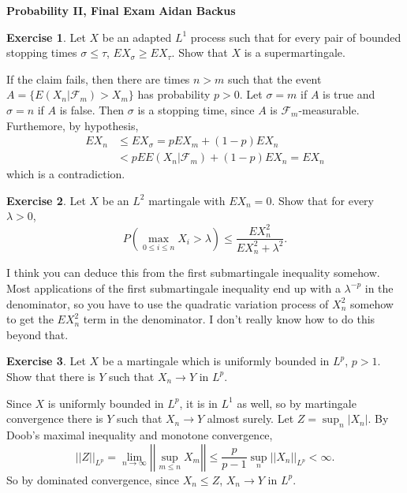 \documentclass[10pt]{article}
\theoremstyle{definition}
\newtheorem{exer}{Exercise}
\begin{document}
\noindent
\large\textbf{Probability II, Final Exam} \hfill \textbf{Aidan Backus} \\

\begin{exer}
Let $X$ be an adapted $L^1$ process such that for every pair of bounded stopping times $\sigma \leq \tau$, $EX_\sigma \geq EX_\tau$.
Show that $X$ is a supermartingale.
\end{exer}

If the claim fails, then there are times $n > m$ such that the event $A = \{E(X_n|\mathcal F_m) > X_m\}$ has probability $p > 0$.
Let $\sigma = m$ if $A$ is true and $\sigma = n$ if $A$ is false.
Then $\sigma$ is a stopping time, since $A$ is $\mathcal F_m$-measurable.
Furthemore, by hypothesis,
\begin{align*}
EX_n &\leq EX_\sigma = pEX_m + (1 - p)EX_n \\
&< pEE(X_n|\mathcal F_m) + (1 - p)EX_n = EX_n
\end{align*}
which is a contradiction.

\begin{exer}
Let $X$ be an $L^2$ martingale with $EX_n = 0$. Show that for every $\lambda > 0$,
$$P\left(\max_{0 \leq i \leq n} X_i > \lambda\right) \leq \frac{EX_n^2}{EX_n^2 + \lambda^2}.$$
\end{exer}

I think you can deduce this from the first submartingale inequality somehow.
Most applications of the first submartingale inequality end up with a $\lambda^{-p}$ in the denominator, so you have to use the quadratic variation process of $X_n^2$ somehow to get the $EX_n^2$ term in the denominator.
I don't really know how to do this beyond that.

\begin{exer}
Let $X$ be a martingale which is uniformly bounded in $L^p$, $p > 1$.
Show that there is $Y$ such that $X_n \to Y$ in $L^p$.
\end{exer}

Since $X$ is uniformly bounded in $L^p$, it is in $L^1$ as well, so by martingale convergence there is $Y$ such that $X_n \to Y$ almost surely.
Let $Z = \sup_n |X_n|$.
By Doob's maximal inequality and monotone convergence,
$$||Z||_{L^p} = \lim_{n \to \infty} \left|\left|\sup_{m \leq n} X_m\right|\right| \leq \frac{p}{p - 1} \sup_n ||X_n||_{L^p} < \infty.$$
So by dominated convergence, since $X_n \leq Z$, $X_n \to Y$ in $L^p$.
\end{document}
